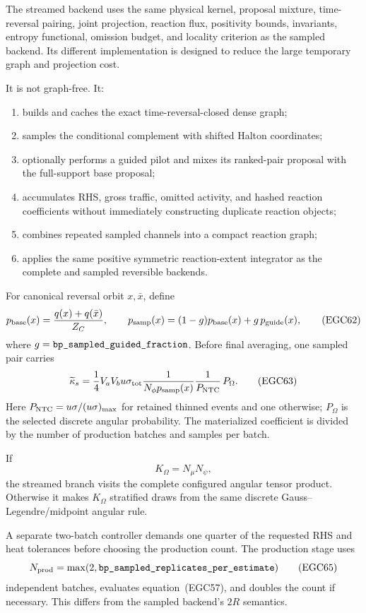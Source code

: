 The streamed backend uses the same physical kernel, proposal mixture,
time-reversal pairing, joint projection, reaction flux, positivity bounds,
invariants, entropy functional, omission budget, and locality criterion as the
sampled backend.  Its different implementation is designed to reduce the
large temporary graph and projection cost.

It is not graph-free.  It:
\begin{enumerate}
\item builds and caches the exact time-reversal-closed dense graph;
\item samples the conditional complement with shifted Halton coordinates;
\item optionally performs a guided pilot and mixes its ranked-pair proposal
      with the full-support base proposal;
\item accumulates RHS, gross traffic, omitted activity, and hashed reaction
      coefficients without immediately constructing duplicate reaction
      objects;
\item combines repeated sampled channels into a compact reaction graph;
\item applies the same positive symmetric reaction-extent integrator as the
      complete and sampled reversible backends.
\end{enumerate}

For canonical reversal orbit \(x,\bar x\), define
\[
 p_{\rm base}(x)=\frac{q(x)+q(\bar x)}{Z_C},\qquad
 p_{\rm samp}(x)=(1-g)p_{\rm base}(x)+g\,p_{\rm guide}(x),
                                                               \tag{EGC62}
\]
where \(g=\code{bp_sampled_guided_fraction}\).
Before final averaging, one sampled pair carries
\[
 \widetilde\kappa_s=
 \frac14V_aV_bu\sigma_{\rm tot}
 \frac{1}{N_\phi p_{\rm samp}(x)}
 \frac{1}{P_{\rm NTC}}\,
 P_\Omega.                                               \tag{EGC63}
\]
Here \(P_{\rm NTC}=u\sigma/(u\sigma)_{\max}\) for retained thinned events and
one otherwise; \(P_\Omega\) is the selected discrete angular probability.
The materialized coefficient is divided by the number of production batches
and samples per batch.

If
\[
 K_\Omega=N_\mu N_\psi,                                  \tag{EGC64}
\]
the streamed branch visits the complete configured angular tensor product.
Otherwise it makes \(K_\Omega\) stratified draws from the same discrete
Gauss--Legendre/midpoint angular rule.

A separate two-batch controller demands one quarter of the requested RHS and
heat tolerances before choosing the production count.  The production stage
uses
\[
 N_{\rm prod}=\max(2,\code{bp_sampled_replicates_per_estimate})
                                                               \tag{EGC65}
\]
independent batches, evaluates equation~(EGC57), and doubles the count if
necessary.  This differs from the sampled backend's \(2R\) semantics.

